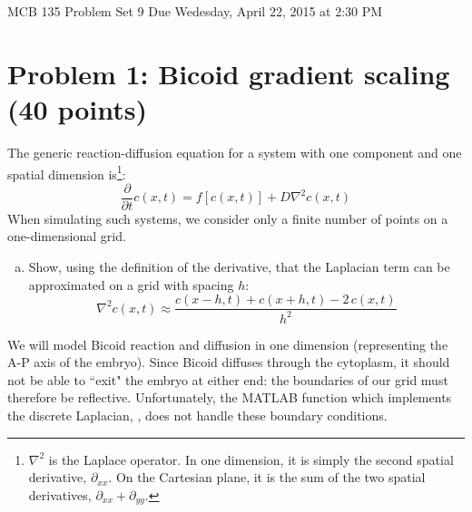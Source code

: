 \documentclass{article}
\begin{document}
\large

MCB 135 Problem Set 9 \hfill Due Wedesday, April 22, 2015 at 2:30 PM

\section*{Problem 1: Bicoid gradient scaling (40 points)}

The generic reaction-diffusion equation for a system with one component and one spatial dimension is\footnote{$\nabla^2$ is the Laplace operator. In one dimension, it is simply the second spatial derivative, $\partial_{xx}$. On the Cartesian plane, it is the sum of the two spatial derivatives, $\partial_{xx} + \partial_{yy}$.}:
\[ \frac{\partial}{\partial t} c(x,t) = f\left[ c(x,t) \right] + D \nabla^2  c(x,t) \]
When simulating such systems, we consider only a finite number of points on a one-dimensional grid.
\begin{enumerate}[a)]
\item Show, using the definition of the derivative, that the Laplacian term can be approximated on a grid with spacing $h$:
\[  \nabla^2 c(x,t) \approx  \frac{c(x-h,t) + c(x+h,t) - 2 \, c(x,t)}{h^2} \]
\end{enumerate}
We will model Bicoid reaction and diffusion in one dimension (representing the A-P axis of the embryo). Since Bicoid diffuses through the cytoplasm, it should not be able to ``exit" the embryo at either end: the boundaries of our grid must therefore be reflective. Unfortunately, the MATLAB function which implements the discrete Laplacian, , does not handle these boundary conditions.
\end{document}
